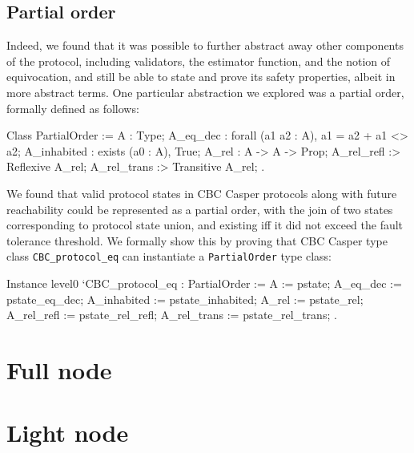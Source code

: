 \documentclass[runningheads]{llncs}
\begin{document}
\subsection{Partial order}
 Indeed, we found that it was possible to further abstract away other components of the protocol, including validators, the estimator function, and the notion of equivocation, and still be able to state and prove its safety properties, albeit in more abstract terms. One particular abstraction we explored was a partial order, formally defined as follows: 
\begin{coq} 
	Class PartialOrder :=
	{ A : Type;
		A_eq_dec : forall (a1 a2 : A), {a1 = a2} + {a1 <> a2};
		A_inhabited : exists (a0 : A), True; 
		A_rel : A -> A -> Prop;
		A_rel_refl :> Reflexive A_rel;
		A_rel_trans :> Transitive A_rel;
	}.
\end{coq} 	
We found that valid protocol states in CBC Casper protocols along with future reachability could be represented as a partial order, with the join of two states corresponding to protocol state union, and existing iff it did not exceed the fault tolerance threshold. We formally show this by proving that CBC Casper type class \verb|CBC_protocol_eq| can instantiate a \verb|PartialOrder| type class: 
\begin{coq}
	Instance level0 `{CBC_protocol_eq} : PartialOrder :=
	{ A := pstate;
		A_eq_dec := pstate_eq_dec;
		A_inhabited := pstate_inhabited;
		A_rel := pstate_rel;
		A_rel_refl := pstate_rel_refl;
		A_rel_trans := pstate_rel_trans;
	}.
\end{coq}


\section{Full node} 
\label{sec:full}


\section{Light node}
\label{sec:light}

\end{document}
